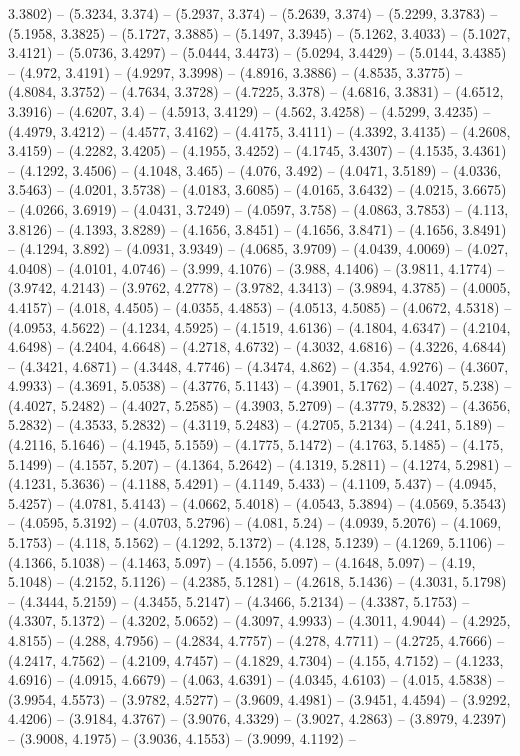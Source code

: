 3.3802) -- (5.3234, 3.374) -- (5.2937, 3.374) -- (5.2639, 3.374) -- (5.2299, 3.3783) -- (5.1958, 3.3825) -- (5.1727, 3.3885) -- (5.1497, 3.3945) -- (5.1262, 3.4033) -- (5.1027, 3.4121) -- (5.0736, 3.4297) -- (5.0444, 3.4473) -- (5.0294, 3.4429) -- (5.0144, 3.4385) -- (4.972, 3.4191) -- (4.9297, 3.3998) -- (4.8916, 3.3886) -- (4.8535, 3.3775) -- (4.8084, 3.3752) -- (4.7634, 3.3728) -- (4.7225, 3.378) -- (4.6816, 3.3831) -- (4.6512, 3.3916) -- (4.6207, 3.4) -- (4.5913, 3.4129) -- (4.562, 3.4258) -- (4.5299, 3.4235) -- (4.4979, 3.4212) -- (4.4577, 3.4162) -- (4.4175, 3.4111) -- (4.3392, 3.4135) -- (4.2608, 3.4159) -- (4.2282, 3.4205) -- (4.1955, 3.4252) -- (4.1745, 3.4307) -- (4.1535, 3.4361) -- (4.1292, 3.4506) -- (4.1048, 3.465) -- (4.076, 3.492) -- (4.0471, 3.5189) -- (4.0336, 3.5463) -- (4.0201, 3.5738) -- (4.0183, 3.6085) -- (4.0165, 3.6432) -- (4.0215, 3.6675) -- (4.0266, 3.6919) -- (4.0431, 3.7249) -- (4.0597, 3.758) -- (4.0863, 3.7853) -- (4.113, 3.8126) -- (4.1393, 3.8289) -- (4.1656, 3.8451) -- (4.1656, 3.8471) -- (4.1656, 3.8491) -- (4.1294, 3.892) -- (4.0931, 3.9349) -- (4.0685, 3.9709) -- (4.0439, 4.0069) -- (4.027, 4.0408) -- (4.0101, 4.0746) -- (3.999, 4.1076) -- (3.988, 4.1406) -- (3.9811, 4.1774) -- (3.9742, 4.2143) -- (3.9762, 4.2778) -- (3.9782, 4.3413) -- (3.9894, 4.3785) -- (4.0005, 4.4157) -- (4.018, 4.4505) -- (4.0355, 4.4853) -- (4.0513, 4.5085) -- (4.0672, 4.5318) -- (4.0953, 4.5622) -- (4.1234, 4.5925) -- (4.1519, 4.6136) -- (4.1804, 4.6347) -- (4.2104, 4.6498) -- (4.2404, 4.6648) -- (4.2718, 4.6732) -- (4.3032, 4.6816) -- (4.3226, 4.6844) -- (4.3421, 4.6871) -- (4.3448, 4.7746) -- (4.3474, 4.862) -- (4.354, 4.9276) -- (4.3607, 4.9933) -- (4.3691, 5.0538) -- (4.3776, 5.1143) -- (4.3901, 5.1762) -- (4.4027, 5.238) -- (4.4027, 5.2482) -- (4.4027, 5.2585) -- (4.3903, 5.2709) -- (4.3779, 5.2832) -- (4.3656, 5.2832) -- (4.3533, 5.2832) -- (4.3119, 5.2483) -- (4.2705, 5.2134) -- (4.241, 5.189) -- (4.2116, 5.1646) -- (4.1945, 5.1559) -- (4.1775, 5.1472) -- (4.1763, 5.1485) -- (4.175, 5.1499) -- (4.1557, 5.207) -- (4.1364, 5.2642) -- (4.1319, 5.2811) -- (4.1274, 5.2981) -- (4.1231, 5.3636) -- (4.1188, 5.4291) -- (4.1149, 5.433) -- (4.1109, 5.437) -- (4.0945, 5.4257) -- (4.0781, 5.4143) -- (4.0662, 5.4018) -- (4.0543, 5.3894) -- (4.0569, 5.3543) -- (4.0595, 5.3192) -- (4.0703, 5.2796) -- (4.081, 5.24) -- (4.0939, 5.2076) -- (4.1069, 5.1753) -- (4.118, 5.1562) -- (4.1292, 5.1372) -- (4.128, 5.1239) -- (4.1269, 5.1106) -- (4.1366, 5.1038) -- (4.1463, 5.097) -- (4.1556, 5.097) -- (4.1648, 5.097) -- (4.19, 5.1048) -- (4.2152, 5.1126) -- (4.2385, 5.1281) -- (4.2618, 5.1436) -- (4.3031, 5.1798) -- (4.3444, 5.2159) -- (4.3455, 5.2147) -- (4.3466, 5.2134) -- (4.3387, 5.1753) -- (4.3307, 5.1372) -- (4.3202, 5.0652) -- (4.3097, 4.9933) -- (4.3011, 4.9044) -- (4.2925, 4.8155) -- (4.288, 4.7956) -- (4.2834, 4.7757) -- (4.278, 4.7711) -- (4.2725, 4.7666) -- (4.2417, 4.7562) -- (4.2109, 4.7457) -- (4.1829, 4.7304) -- (4.155, 4.7152) -- (4.1233, 4.6916) -- (4.0915, 4.6679) -- (4.063, 4.6391) -- (4.0345, 4.6103) -- (4.015, 4.5838) -- (3.9954, 4.5573) -- (3.9782, 4.5277) -- (3.9609, 4.4981) -- (3.9451, 4.4594) -- (3.9292, 4.4206) -- (3.9184, 4.3767) -- (3.9076, 4.3329) -- (3.9027, 4.2863) -- (3.8979, 4.2397) -- (3.9008, 4.1975) -- (3.9036, 4.1553) -- (3.9099, 4.1192) -- 